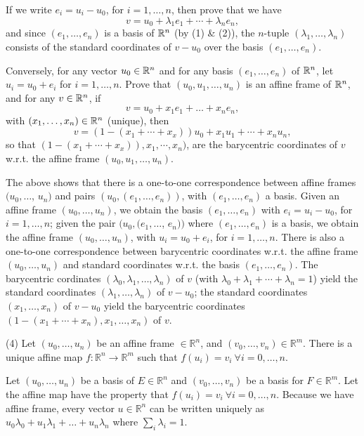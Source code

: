 \documentclass[12pt]{article}
\begin{document}
\medskip
If we write $e_i = u_i -  u_0$, for $i = 1, \ldots, n$, then prove that
we have
\[
v = u_0 + \lambda_1 e_1 + \cdots + \lambda_n e_n,
\]
and since $(e_1, \ldots, e_n)$ is a basis of $\mathbb{R}^n$ (by (1) \&
(2)), the $n$-tuple $(\lambda_1, \ldots, \lambda_n)$ consists of the 
standard coordinates of $v - u_0$ over the basis $(e_1, \ldots, e_n)$.

\medskip
Conversely, for any vector $u_0\in \mathbb{R}^n$ and for any basis
$(e_1, \ldots, e_n)$ of $\mathbb{R}^n$, let
$u_i = u_0 + e_i$ for $i = 1, \ldots, n$. Prove
that $(u_0, u_1, \ldots, u_n)$ is an affine frame of $\mathbb{R}^n$, 
and for any $v\in \mathbb{R}^n$, if  
\[
v = u_0 + x_1 e_1 + \dots + x_n e_n,
\]
with $(x_1, \ldots, x_n) \in \mathbb{R}^n$ (unique), then
\[
v = (1 - (x_1 + \cdots + x_x)) u_0 + x_1 u_1 + \cdots + x_n u_n,
\]
so that $(1 - (x_1 + \cdots + x_x)), x_1, \cdots,  x_n)$,
are the barycentric coordinates of $v$ w.r.t. the affine frame
$(u_0, u_1, \ldots, u_n)$.

\medskip
The above shows that there is a one-to-one correspondence between
affine frames $(u_0, \ldots$, $u_n)$ and pairs
$(u_0, (e_1, \ldots, e_n))$, with  $(e_1, \ldots, e_n)$  a basis.
Given  an affine frame  $(u_0, \ldots, u_n)$, we obtain the basis
$(e_1, \ldots, e_n)$ with $e_i = u_i - u_0$, for $i = 1, \ldots, n$;
given the pair $(u_0, (e_1, \ldots$, $e_n))$ where  $(e_1, \ldots, e_n)$
is a basis,  we obtain the affine frame   $(u_0, \ldots, u_n)$, with
$u_i = u_0 + e_i$, for $i = 1, \ldots, n$.
There is also a  one-to-one correspondence between
barycentric coordinates w.r.t. the affine frame
$(u_0, \ldots, u_n)$ and standard coordinates w.r.t.
the basis   $(e_1, \ldots, e_n)$.
The barycentric cordinates $(\lambda_0, \lambda_1, \ldots, \lambda_n)$
of $v$
(with $\lambda_0 + \lambda_1 + \cdots + \lambda_n = 1$) 
yield the standard coordinates $(\lambda_1, \ldots, \lambda_n)$ of $v - u_0$;
the standard coordinates $(x_1, \ldots, x_n)$ of $v - u_0$ yield the 
barycentric coordinates $(1 - (x_1 + \cdots + x_n ), x_1, \ldots,
x_n)$ of $v$.

\medskip
(4) 
Let $(u_0, \ldots, u_n)$ be an affine frame $\in \mathbb{R} ^n$, and $(v_0, \ldots, v_n) \in \mathbb{R}^m$. There is a unique affine map $f: \mathbb{R} ^n \rightarrow \mathbb{R} ^m$ such that $f(u_i) = v_i\ \forall i = 0, \ldots,	n$. 

Let $(u_0, \ldots, u_n)$ be a basis of $E \in \mathbb{R}^n$ and $(v_0, \ldots, v_n)$ be a basis for $F \in \mathbb{R}^m $. Let the affine map have the property that $f(u_i) = v_i\ \forall i = 0, \ldots,	n$. Because we have affine frame, every vector $u \in \mathbb{R}^n$ can be written uniquely as $u_0\lambda_0 + u_1\lambda_1 + \ldots + u_n\lambda_n$ where $\sum_i \lambda_i = 1$. \\
\end{document}
